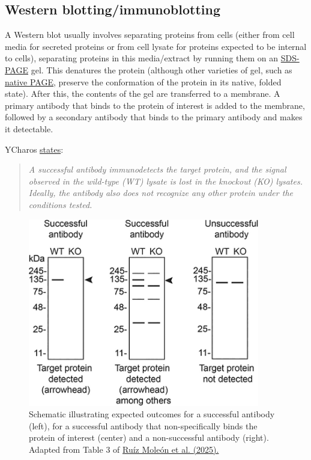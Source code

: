 \documentclass[letterpaper, 12pt]{article}
\begin{document}
\pagebreak

\subsection*{Western blotting/immunoblotting}

A Western blot usually involves separating proteins from cells (either from cell media for secreted proteins or from cell lysate for proteins expected to be internal to cells), separating proteins in this media/extract by running them on an \href{https://en.wikipedia.org/wiki/SDS-PAGE.}{SDS-PAGE} gel. This denatures the protein (although other varieties of gel, such as \href{https://www.med.unc.edu/pharm/sondeklab/wp-content/uploads/sites/868/2018/10/Native-gel-analysis.pdf}{native PAGE}, preserve the conformation of the protein in its native, folded state). After this, the contents of the gel are transferred to a membrane. A primary antibody that binds to the protein of interest is added to the membrane, followed by a secondary antibody that binds to the primary antibody and makes it detectable.

YCharos \href{https://f1000research.com/gateways/ycharos/faqs}{states}:

\begin{quote}
    \textit{A successful antibody immunodetects the target protein, and the signal observed in the wild-type (WT) lysate is lost in the knockout (KO) lysates. Ideally, the antibody also does not recognize any other protein under the conditions tested.}
\end{quote}

\begin{figure}[h!tbp]
    \centering
    \includegraphics[width=0.9\textwidth]{img/antibody_val/ycharos_wb.jpg}
    \caption*{Schematic illustrating expected outcomes for a successful antibody (left), for a successful antibody that non-specifically binds the protein of interest (center) and a non-successful antibody (right). Adapted from Table 3 of \href{https://doi.org/10.12688/f1000research.155929.2}{Ru\'iz Mole\'on et al. (2025).}}
\end{figure}
\end{document}
